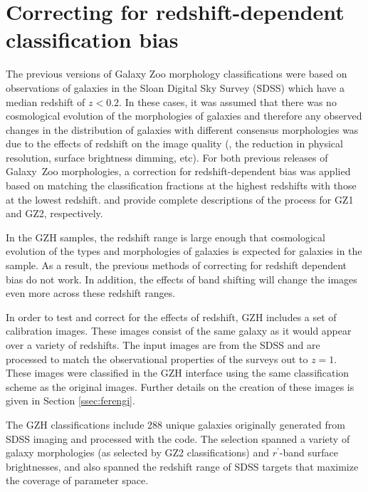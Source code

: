 \documentclass[twocolumn]{aastex6}
\begin{document}
\section{Correcting for redshift-dependent classification bias}\label{sec:debiasing}

The previous versions of Galaxy Zoo morphology classifications
\citep{lin11,wil13} were based on observations of galaxies in the Sloan Digital
Sky Survey (SDSS) which have a median redshift of $z<0.2$. In these cases, it
was assumed that there was no cosmological evolution of the morphologies of
galaxies and therefore any observed changes in the distribution of galaxies
with different consensus morphologies was due to the effects of redshift on the
image quality (\ie, the reduction in physical resolution, surface brightness
dimming, etc). For both previous releases of Galaxy~Zoo morphologies, a correction for
redshift-dependent bias was applied based on matching the classification
fractions at the highest redshifts with those at the lowest redshift.
\citet{bam09} and \citet{wil13} provide complete descriptions of the process
for GZ1 and GZ2, respectively.

In the GZH samples, the redshift range is large enough that cosmological
evolution of the types and morphologies of galaxies is expected for galaxies in
the sample. As a result, the previous methods of correcting for redshift
dependent bias do not work. In addition, the effects of band shifting will
change the images even more across these redshift ranges. 

In order to test and correct for the effects of redshift, GZH includes a set of
calibration images. These images consist of the same galaxy as it would appear
over a variety of redshifts. The input images are from the SDSS
\citep{yor00,str02} and are processed to match the observational properties of 
the \hst{} surveys out to $z=1$. These
images were classified in the GZH interface using the same classification
scheme as the original \hst{} images. Further details on the creation of these images
is given in Section \ref{ssec:ferengi}.

The GZH classifications include 288 unique galaxies originally generated from
SDSS imaging and processed with the \ferengi{} code. The selection spanned a
variety of galaxy morphologies (as selected by GZ2 classifications) and
$r^\prime$-band surface brightnesses, and also spanned the redshift range of
SDSS targets that maximize the coverage of parameter space. 
\end{document}
